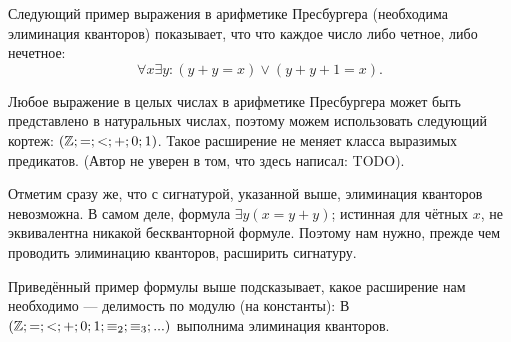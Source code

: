     \begin{Example}
        Следующий пример выражения в арифметике Пресбургера (необходима элиминация кванторов) показывает, что что каждое число либо четное, либо нечетное:
        $$\forall x \exists y : (y + y = x) \vee (y + y + 1 = x).$$
    \end{Example}
    \begin{Rem}
        Любое выражение в целых числах в арифметике Пресбургера может быть представлено в натуральных числах, поэтому можем использовать следующий кортеж: $(\mathbb{Z}; =; <; +; 0; 1)$. Такое расширение не меняет класса выразимых предикатов. (Автор не уверен в том, что здесь написал: TODO).
    \end{Rem}
    
    
    \begin{Rem}
        Отметим сразу же, что с сигнатурой, указанной выше, элиминация кванторов невозможна. В самом деле, формула $\exists y (x = y + y)$; истинная для чётных $x$, не эквивалентна никакой бескванторной формуле. Поэтому нам нужно, прежде чем проводить элиминацию кванторов, расширить сигнатуру.
    \end{Rem}
    
    
    \begin{Thm}
        Приведённый пример формулы выше подсказывает, какое расширение нам необходимо --- делимость по модулю (на константы): В $(\mathbb{Z}; =; <; +; 0; 1; \equiv_2; \equiv_3; ...)$ выполнима элиминация кванторов.
    \end{Thm}

    

    
    
